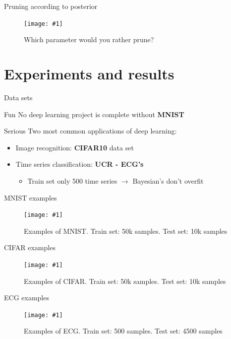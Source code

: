 \documentclass{beamer}
\newcommand{\fitfigure}[1]{\centering\texttt{[image: \#1]}}
\begin{document}
\begin{frame}{Pruning according to posterior}
	\begin{figure}
		\fitfigure{/home/rob/Dropbox/ml_projects/weight_uncertainty/weight_uncertainty/im/two_distro_pruning.png}
		\caption{Which parameter would you rather prune?}
	\end{figure}
\end{frame}

\section{Experiments and results}
\begin{frame}{Data sets}
	\begin{block}{Fun}
		No deep learning project is complete without \textbf{MNIST}
	\end{block}
			
	\begin{block}{Serious}
		Two most common applications of deep learning:
						
		\begin{itemize}
			\item Image recognition: \textbf{CIFAR10} data set
			\item Time series classification: \textbf{UCR - ECG's}
			      \begin{itemize}
			      	\item Train set only 500 time series $\rightarrow$ Bayesian's don't overfit
			      \end{itemize}
		\end{itemize}
	\end{block}
\end{frame}

\begin{frame}{MNIST examples}
	\begin{figure}
		\fitfigure{im/mnist_examples.png}
		\caption{Examples of MNIST. Train set: 50k samples. Test set: 10k samples}
	\end{figure}
\end{frame}

\begin{frame}{CIFAR examples}
	\begin{figure}
		\fitfigure{im/cifar_examples.png}
		\caption{Examples of CIFAR. Train set: 50k samples. Test set: 10k samples}
	\end{figure}
\end{frame}

\begin{frame}{ECG examples}
	\begin{figure}
		\fitfigure{im/ucr_examples.png}
		\caption{Examples of ECG. Train set: 500 samples. Test set: 4500 samples}
	\end{figure}
\end{frame}
\end{document}
